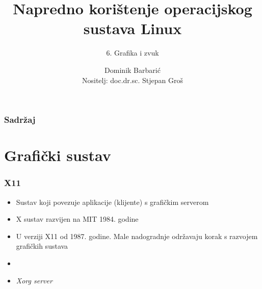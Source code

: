 \documentclass[t,table,usenames,dvipsnames]{beamer}
\date{\todayiso}
\title[NKOSL]{Napredno korištenje operacijskog sustava Linux}
\author[Dominik Barbarić]{Dominik Barbarić\\{\small Nositelj: doc.dr.sc. Stjepan Groš}}
\subtitle{6. Grafika i zvuk}
\institute[FER]{Sveučilište u Zagrebu\\Fakultet elektrotehnike i računarstva}
\begin{document}
{
	\begin{frame}
		\maketitle
	\end{frame}
}

\begin{frame}
	\frametitle{Sadržaj}
	\tableofcontents
\end{frame}



\section{Grafički sustav}


\begin{frame}
	\frametitle{X11}
	\begin{itemize}
		\item Sustav koji povezuje aplikacije (klijente) s grafičkim serverom
		\item X sustav razvijen na MIT 1984. godine
		\item U verziji X11 od 1987. godine. Male nadogradnje održavaju korak s razvojem grafičkih sustava
		\item[]
		\item \emph{Xorg server}
	\end{itemize}
\end{frame}
\end{document}
